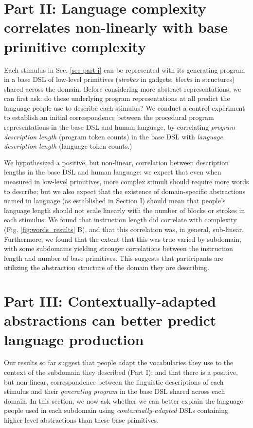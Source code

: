 \documentclass[10pt,letterpaper]{article}
\begin{document}
\section{Part II: Language complexity correlates non-linearly with base primitive complexity} \label{sec-part-ii}
Each stimulus in Sec. \ref{sec-part-i} can be represented with its generating program in a base DSL of low-level primitives (\textit{strokes} in gadgets; \textit{blocks} in structures) shared across the domain. Before considering more abstract representations, we can first ask: do these underlying program representations at all predict the language people use to describe each stimulus? We conduct a control experiment to establish an initial correspondence between the procedural program representations in the base DSL and human language, by correlating \textit{program description length} (program token counts) in the base DSL with \textit{language description length} (language token counts.)  

We hypothesized a positive, but non-linear, correlation between description lengths in the base DSL and human language: we expect that even when measured in low-level primitives, more complex stimuli should require more words to describe; but we also expect that the existence of domain-specific abstractions named in language (as established in Section I) should mean that people's language length should not scale linearly with the number of blocks or strokes in each stimulus.
We found that instruction length did correlate with complexity (Fig. \ref{fig:words_results} B), and that this correlation was, in general, sub-linear. %
Furthermore, we found that the extent that this was true varied by subdomain, with some subdomains yielding stronger correlations between the instruction length and number of base primitives. %
This suggests that participants are utilizing the abstraction structure of the domain they are describing.

\section{Part III: Contextually-adapted abstractions can better predict language production}\label{sec-part-iii}
Our results so far suggest that people adapt the vocabularies they use to the context of the subdomain they described (Part I); and that there is a positive, but non-linear, correspondence between the linguistic descriptions of each stimulus and their \textit{generating program} in the base DSL shared across each domain. In this section, we now ask whether we can better explain the language people used in each subdomain using \textit{contextually-adapted} DSLs containing higher-level abstractions than these base primitives. 
\end{document}
